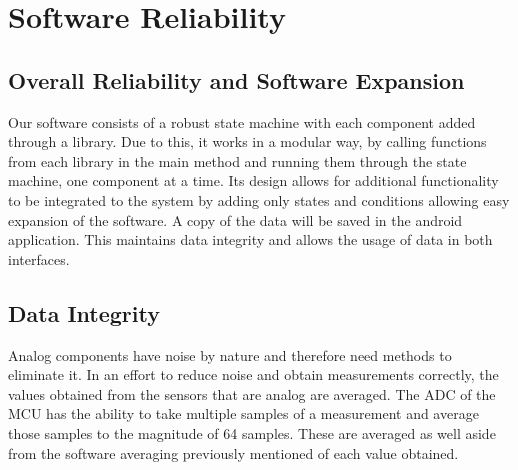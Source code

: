 \section{Software Reliability}

\subsection{Overall Reliability and Software Expansion}
	Our software consists of a robust state machine with each component added through a library. Due to this, it works in a modular way, by calling functions from each library in the main method and running them through the state machine, one component at a time. Its design allows for additional functionality to be integrated to the system by adding only states and conditions allowing easy expansion of the software. A copy of the data will be saved in the android application. This maintains data integrity and allows the usage of data in both interfaces. 
	
	\subsection{Data Integrity}
	Analog components have noise by nature and therefore need methods to eliminate it. In an effort to reduce noise and obtain measurements correctly, the values obtained from the sensors that are analog are averaged. The ADC of the MCU has the ability to take multiple samples of a measurement and average those samples to the magnitude of 64 samples. These are averaged as well aside from the software averaging previously mentioned of each value obtained.

